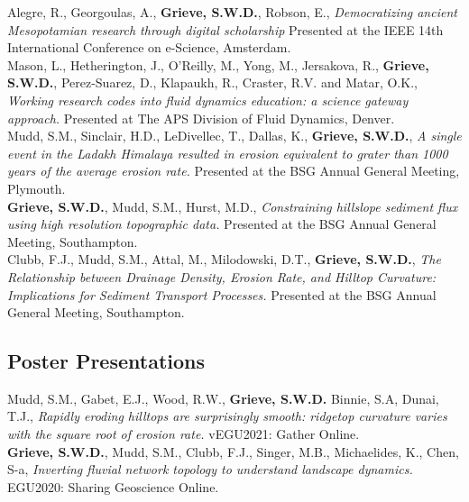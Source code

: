 \documentclass[10pt, a4paper]{article}
\newcommand{\years}[1]{\marginnote{\scriptsize #1}}
\begin{document}
\years{2018}Alegre, R., Georgoulas, A., \textbf{Grieve, S.W.D.}, Robson, E., \textit{Democratizing ancient Mesopotamian research through digital scholarship} Presented at the IEEE 14th International Conference on e-Science, Amsterdam.\\[0.05cm]

\years{2017}Mason, L., Hetherington, J., O'Reilly, M., Yong, M., Jersakova, R., \textbf{Grieve, S.W.D.}, Perez-Suarez, D., Klapaukh, R., Craster, R.V. and Matar, O.K., \textit{Working research codes into fluid dynamics education: a science gateway approach.} Presented at The APS Division of Fluid Dynamics, Denver.\\[0.05cm]

\years{2016}Mudd, S.M., Sinclair, H.D., LeDivellec, T., Dallas, K., \textbf{Grieve, S.W.D.}, \textit{A single event in the Ladakh Himalaya resulted in erosion equivalent to grater than 1000 years of the average erosion rate.} Presented at the BSG Annual General Meeting, Plymouth.\\[0.05cm]

\years{2015}\textbf{Grieve, S.W.D.}, Mudd, S.M., Hurst, M.D., \textit{Constraining hillslope sediment flux using high resolution topographic data.} Presented at the BSG Annual General Meeting, Southampton.\\[0.05cm]

\years{2015}Clubb, F.J., Mudd, S.M., Attal, M., Milodowski, D.T., \textbf{Grieve, S.W.D.}, \textit{The Relationship between Drainage Density, Erosion Rate, and Hilltop Curvature: Implications for Sediment Transport Processes.} Presented at the BSG Annual General Meeting, Southampton.

\subsection*{Poster Presentations}

\years{2021}Mudd, S.M., Gabet, E.J., Wood, R.W., \textbf{Grieve, S.W.D.} Binnie, S.A, Dunai, T.J., \textit{Rapidly eroding hilltops are surprisingly smooth: ridgetop curvature varies with the square root of erosion rate.} vEGU2021: Gather Online.\\[0.5cm]

\years{2020}\textbf{Grieve, S.W.D.}, Mudd, S.M., Clubb, F.J., Singer, M.B., Michaelides, K., Chen, S-a, \textit{Inverting fluvial network topology to understand landscape dynamics.} EGU2020: Sharing Geoscience Online.\\[0.5cm]
\end{document}
